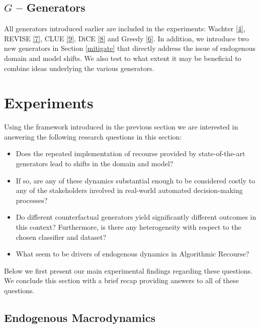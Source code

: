 \documentclass[conference,final,]{IEEEtran}
\providecommand{\tightlist}{%
  \setlength{\itemsep}{0pt}\setlength{\parskip}{0pt}}
\theoremstyle{definition}
\theoremstyle{definition}
\theoremstyle{definition}
\theoremstyle{definition}
\theoremstyle{remark}
\begin{document}
\hypertarget{g-generators}{%
\subsection{\texorpdfstring{\(G\) -- Generators}{G -- Generators}}\label{g-generators}}

All generators introduced earlier are included in the experiments: Wachter \protect\hyperlink{ref-wachter2017counterfactual}{{[}4{]}}, REVISE \protect\hyperlink{ref-joshi2019towards}{{[}7{]}}, CLUE \protect\hyperlink{ref-antoran2020getting}{{[}9{]}}, DiCE \protect\hyperlink{ref-mothilal2020explaining}{{[}8{]}} and Greedy \protect\hyperlink{ref-schut2021generating}{{[}6{]}}. In addition, we introduce two new generators in Section \ref{mitigate} that directly address the issue of endogenous domain and model shifts. We also test to what extent it may be beneficial to combine ideas underlying the various generators.

\hypertarget{empirical-2}{%
\section{Experiments}\label{empirical-2}}

Using the framework introduced in the previous section we are interested in answering the following research questions in this section:

\begin{itemize}
\tightlist
\item
  Does the repeated implementation of recourse provided by state-of-the-art generators lead to shifts in the domain and model?
\item
  If so, are any of these dynamics substantial enough to be considered costly to any of the stakeholders involved in real-world automated decision-making processes?
\item
  Do different counterfactual generators yield significantly different outcomes in this context? Furthermore, is there any heterogeneity with respect to the chosen classifier and dataset?
\item
  What seem to be drivers of endogenous dynamics in Algorithmic Recourse?
\end{itemize}

Below we first present our main experimental findings regarding these questions. We conclude this section with a brief recap providing answers to all of these questions.

\hypertarget{endogenous-macrodynamics}{%
\subsection{Endogenous Macrodynamics}\label{endogenous-macrodynamics}}
\end{document}
